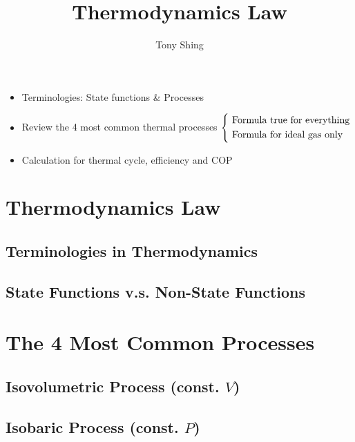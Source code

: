 \documentclass[class=article, crop=false, 12pt]{standalone}
\author{Tony Shing}
\title{Thermodynamics \nth{1} Law}
\begin{document}
\maketitle


\begin{overview}
    \begin{itemize}
        \item Terminologies: State functions \& Processes
        \item Review the 4 most common thermal processes 
        $\left\{ \ \begin{aligned} 
            &\text{Formula true for everything} \\ 
            &\text{Formula for ideal gas only}
         \end{aligned}\right.$
        \item Calculation for thermal cycle, efficiency and COP
    \end{itemize}
\end{overview}


\section{Thermodynamics  Law}


\subsection{Terminologies in Thermodynamics}

\subsection{State Functions v.s. Non-State Functions}

\linesep
\section{The 4 Most Common Processes}

\subsection{Isovolumetric Process (const. $V$)}

\subsection{Isobaric Process (const. $P$)}
\end{document}
